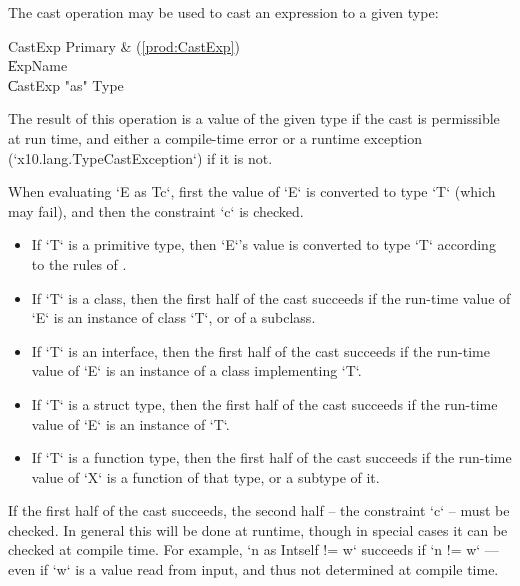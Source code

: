 The cast operation may be used to cast an expression to a given type:

\begin{bbgrammar}
             CastExp \: Primary & (\ref{prod:CastExp}) \\
                    \| ExpName \\
                    \| CastExp \xcd"as" Type \\
\end{bbgrammar}

The result of this operation is a value of the given type if the cast
is permissible at run time, and either a compile-time error or a runtime
exception 
(\xcd`x10.lang.TypeCastException`) if it is not.  

When evaluating \xcd`E as T{c}`, first the value of \xcd`E` is converted to
type \xcd`T` (which may fail), and then the constraint \xcd`{c}` is checked. 



\begin{itemize}
\item If \xcd`T` is a primitive type, then \xcd`E`'s value is converted to type
      \xcd`T` according to the rules of
      . 
      
\item If \xcd`T` is a class, then the first half of the cast succeeds if the
      run-time value of \xcd`E` is an instance of class \xcd`T`, or of a
      subclass. 

\item If \xcd`T` is an interface, then the first half of the cast succeeds if
      the run-time value of \xcd`E` is an instance of a class implementing
      \xcd`T`. 

\item If \xcd`T` is a struct type, then the first half of the cast succeeds if
      the run-time value of \xcd`E` is an instance of \xcd`T`.  

\item If \xcd`T` is a function type, then the first half of the cast succeeds
      if the run-time value of \xcd`X` is a function of that type, or a
      subtype of it.
\end{itemize}

If the first half of the cast succeeds, the second half -- the constraint
\xcd`{c}` -- must be checked.  In general this will be done at runtime, though
in special cases it can be checked at compile time.   For example, 
\xcd`n as Int{self != w}` succeeds if \xcd`n != w` --- even if \xcd`w` is a value
read from input, and thus not determined at compile time.

